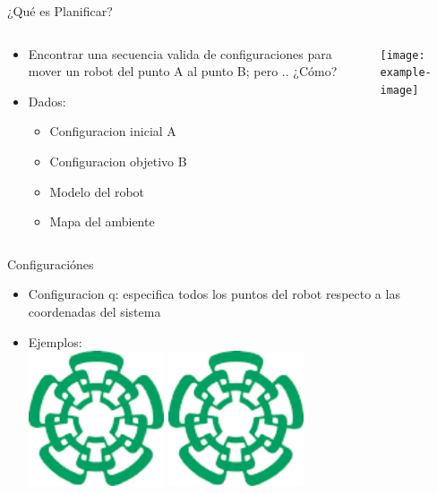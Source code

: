 \documentclass[
	11pt, %
]{beamer}
\begin{document}
\begin{frame}{¿Qu\'{e} es Planificar?}
  \setlength{\leftmargini}{0.5em}
  \begin{columns}[c, onlytextwidth]%
    \begin{column}{.5\textwidth}%
      \setlength{\partopsep}{0pt}%
      \begin{itemize}
        \itemsep 1.5em
      \item <1-> Encontrar una secuencia valida de configuraciones para mover un robot del punto A al punto B; pero .. ¿C\'{o}mo?
      \item <2-> Dados:
        \begin{itemize}
        \item Configuracion inicial A
        \item Configuracion objetivo B
        \item Modelo del robot
        \item Mapa del ambiente
        \end{itemize}
      \end{itemize}
    \end{column}%
    \begin{column}{.45\textwidth}
      \begin{center}
        \texttt{[image: example-image]}
      \end{center}
    \end{column}%
\end{columns}
\end{frame}

\begin{frame}{Configuraci\'{o}nes}
  \begin{itemize}
  \item <1-> Configuracion q: especifica todos los puntos del robot respecto a las coordenadas del sistema
  \item <2-> Ejemplos:\\
    \centering
    \includegraphics[angle=45,width=4cm]{cinvestavlogo}
    \includegraphics[angle=45,width=4cm]{cinvestavlogo}
  \end{itemize}
\end{frame}
\end{document}
